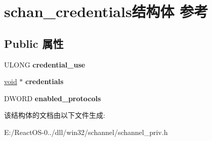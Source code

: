 \hypertarget{structschan__credentials}{}\section{schan\+\_\+credentials结构体 参考}
\label{structschan__credentials}
\subsection*{Public 属性}
\begin{DoxyCompactItemize}
\item 
\mbox{\label{structschan__credentials_a090c02d124195ac038849e1428978327}} 
U\+L\+O\+NG {\bfseries credential\+\_\+use}
\item 
\mbox{\label{structschan__credentials_afc6a7db3d0cce650bae3f2db43515284}} 
\hyperlink{interfacevoid}{void} $\ast$ {\bfseries credentials}
\item 
\mbox{\label{structschan__credentials_a57261a8b2ea1e8d3c709ca16bd4b2e9f}} 
D\+W\+O\+RD {\bfseries enabled\+\_\+protocols}
\end{DoxyCompactItemize}


该结构体的文档由以下文件生成\+:\begin{DoxyCompactItemize}
\item 
E\+:/\+React\+O\+S-\/0../dll/win32/schannel/schannel\+\_\+priv.\+h\end{DoxyCompactItemize}
